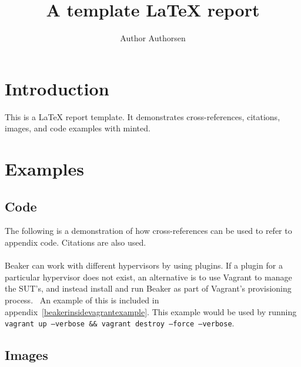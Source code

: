 

\title{A template \LaTeX{} report}
\author{Author Authorsen}



\maketitle


\thispagestyle{empty}

\clearpage
{}
\setcounter{page}{1}
\tableofcontents

\clearpage
{}


\section{Introduction}

This is a \LaTeX{} report template. It demonstrates cross-references, citations, images, and code examples with minted.

\section{Examples}

\subsection{Code}

The following is a demonstration of how cross-references can be used to refer to appendix code. Citations are also used.
\\
\\
Beaker can work with different hypervisors by using plugins. If a plugin for a particular hypervisor does not exist, an alternative is to use Vagrant to manage the SUT's, and instead install and run Beaker as part of Vagrant's provisioning process.~\cite{puppetmodulefunctionaltestingbeakerinsidevagrant}\cite{openstackpuppetmodulefunctionaltestingproposal} An example of this is included in appendix~\ref{beakerinsidevagrantexample}. This example would be used by running \texttt{vagrant up --verbose && vagrant destroy --force --verbose}.

\subsection{Images}

